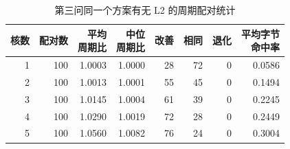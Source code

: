 \begin{table}[htbp]
\caption{第三问同一个方案有无 L2 的周期配对统计}\label{tab:q3_pairs}
\centering\normalsize\setlength{\tabcolsep}{4pt}
\begin{tabular}{rrrrrrrr}
\toprule
核数 & 配对数 & \shortstack{平均\\周期比} & \shortstack{中位\\周期比} & 改善 & 相同 & 退化 & \shortstack{平均字节\\命中率} \\
\midrule
1 & 100 & 1.0003 & 1.0000 & 28 & 72 & 0 & 0.0586 \\
2 & 100 & 1.0013 & 1.0001 & 55 & 45 & 0 & 0.1494 \\
3 & 100 & 1.0145 & 1.0004 & 61 & 39 & 0 & 0.2245 \\
4 & 100 & 1.0290 & 1.0019 & 72 & 28 & 0 & 0.2449 \\
5 & 100 & 1.0560 & 1.0082 & 76 & 24 & 0 & 0.3004 \\
\bottomrule\end{tabular}\end{table}
